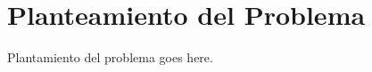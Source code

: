 \chapter{Planteamiento del Problema} \label{chap:planteamientoProblema}

Plantamiento del problema goes here.